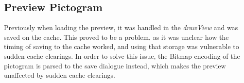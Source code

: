 \subsection{Preview Pictogram}
Previously when loading the preview, it was handled in the \textit{drawView} and was saved on the cache.
This proved to be a problem, as it was unclear how the timing of saving to the cache worked, and using that storage was vulnerable to sudden cache clearings.
In order to solve this issue, the Bitmap encoding of the pictogram is parsed to the save dialogue instead, which makes the preview unaffected by sudden cache clearings.